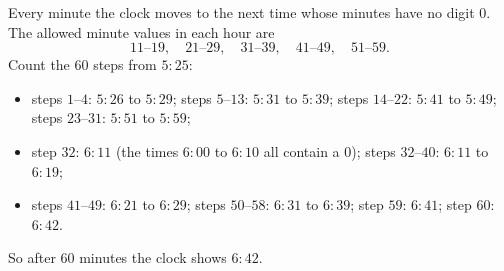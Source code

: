 Every minute the clock moves to the next time whose minutes have no digit $0$. The allowed minute values in each hour are
\[11\text{--}19,\quad21\text{--}29,\quad31\text{--}39,\quad41\text{--}49,\quad51\text{--}59.\]
Count the $60$ steps from $5{:}25$:
\begin{itemize}
\item steps $1$--$4$: $5{:}26$ to $5{:}29$; steps $5$--$13$: $5{:}31$ to $5{:}39$; steps $14$--$22$: $5{:}41$ to $5{:}49$; steps $23$--$31$: $5{:}51$ to $5{:}59$;
\item step $32$: $6{:}11$ (the times $6{:}00$ to $6{:}10$ all contain a $0$); steps $32$--$40$: $6{:}11$ to $6{:}19$;
\item steps $41$--$49$: $6{:}21$ to $6{:}29$; steps $50$--$58$: $6{:}31$ to $6{:}39$; step $59$: $6{:}41$; step $60$: $6{:}42$.
\end{itemize}
So after $60$ minutes the clock shows $\boxed{6{:}42}$.
